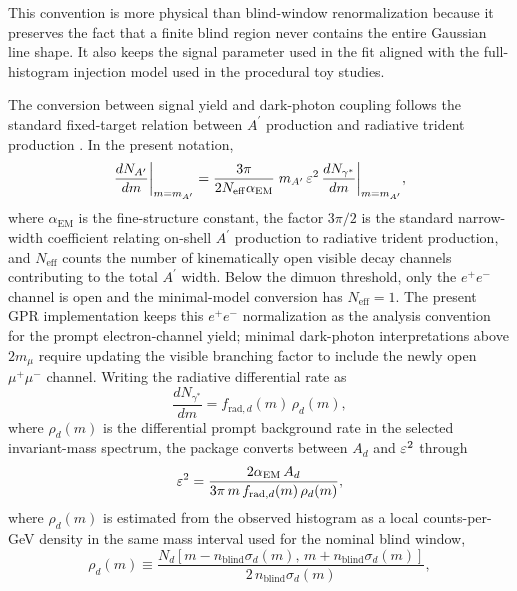This convention is more physical than blind-window renormalization because it preserves
the fact that a finite blind region never contains the entire Gaussian line shape. It
also keeps the signal parameter used in the fit aligned with the full-histogram
injection model used in the procedural toy studies.

The conversion between signal yield and dark-photon coupling follows the standard
fixed-target relation between $A^\prime$ production and radiative trident production
\cite{EssigEtAl2011,HPS2015DarkPhoton,HPS2016PromptLong}. In the present notation,
\begin{equation}
\frac{dN_{A^\prime}}{dm}\bigg|_{m=m_{A^\prime}}
= \frac{3\pi}{2N_{\mathrm{eff}}\alpha_{\mathrm{EM}}}
\; m_{A^\prime}\,\varepsilon^2\,
\frac{dN_{\gamma^\ast}}{dm}\bigg|_{m=m_{A^\prime}},
\end{equation}
where $\alpha_{\mathrm{EM}}$ is the fine-structure constant, the factor $3\pi/2$ is the
standard narrow-width coefficient relating on-shell $A^\prime$ production to radiative
trident production, and $N_{\mathrm{eff}}$ counts the number of kinematically open
visible decay channels contributing to the total $A^\prime$ width. Below the dimuon
threshold, only the $e^+e^-$ channel is open and the minimal-model conversion has
$N_{\mathrm{eff}}=1$. The present GPR implementation keeps this $e^+e^-$ normalization
as the analysis convention for the prompt electron-channel yield; minimal dark-photon
interpretations above $2m_\mu$ require updating the visible branching factor to include
the newly open $\mu^+\mu^-$ channel. Writing the
radiative differential rate as
\begin{equation}
\frac{dN_{\gamma^\ast}}{dm}
= f_{\mathrm{rad},d}(m)\,\rho_d(m),
\end{equation}
where $\rho_d(m)$ is the differential prompt background rate in the selected
invariant-mass spectrum, the package converts between $A_d$ and $\varepsilon^2$ through
\begin{equation}
\varepsilon^2 =
\frac{2\alpha_{\mathrm{EM}}\,A_d}
{3\pi\,m\,f_{\mathrm{rad},d}(m)\,\rho_d(m)},
\label{eq:eps2-conversion}
\end{equation}
where $\rho_d(m)$ is estimated from the observed histogram as a local counts-per-GeV
density in the same mass interval used for the nominal blind window,
\begin{equation}
\rho_d(m)\equiv
\frac{N_d\!\left[m-n_{\mathrm{blind}}\sigma_d(m),\,m+n_{\mathrm{blind}}\sigma_d(m)\right]}
{2\,n_{\mathrm{blind}}\sigma_d(m)},
\end{equation}
